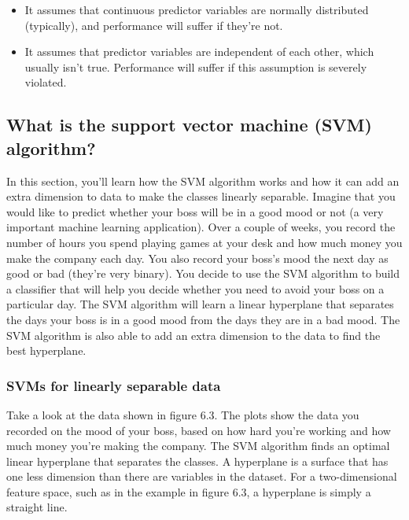 \documentclass[
]{article}
\providecommand{\tightlist}{%
  \setlength{\itemsep}{0pt}\setlength{\parskip}{0pt}}
\begin{document}
\begin{itemize}
\tightlist
\item
  It assumes that continuous predictor variables are normally
  distributed (typically), and performance will suffer if they're not.
\item
  It assumes that predictor variables are independent of each other,
  which usually isn't true. Performance will suffer if this assumption
  is severely violated.
\end{itemize}

\subsection{What is the support vector machine (SVM)
algorithm?}\label{what-is-the-support-vector-machine-svm-algorithm}

In this section, you'll learn how the SVM algorithm works and how it can
add an extra dimension to data to make the classes linearly separable.
Imagine that you would like to predict whether your boss will be in a
good mood or not (a very important machine learning application). Over a
couple of weeks, you record the number of hours you spend playing games
at your desk and how much money you make the company each day. You also
record your boss's mood the next day as good or bad (they're very
binary). You decide to use the SVM algorithm to build a classifier that
will help you decide whether you need to avoid your boss on a particular
day. The SVM algorithm will learn a linear hyperplane that separates the
days your boss is in a good mood from the days they are in a bad mood.
The SVM algorithm is also able to add an extra dimension to the data to
find the best hyperplane.

\subsubsection{SVMs for linearly separable
data}\label{svms-for-linearly-separable-data}

Take a look at the data shown in figure 6.3. The plots show the data you
recorded on the mood of your boss, based on how hard you're working and
how much money you're making the company. The SVM algorithm finds an
optimal linear hyperplane that separates the classes. A hyperplane is a
surface that has one less dimension than there are variables in the
dataset. For a two-dimensional feature space, such as in the example in
figure 6.3, a hyperplane is simply a straight line.
\end{document}
